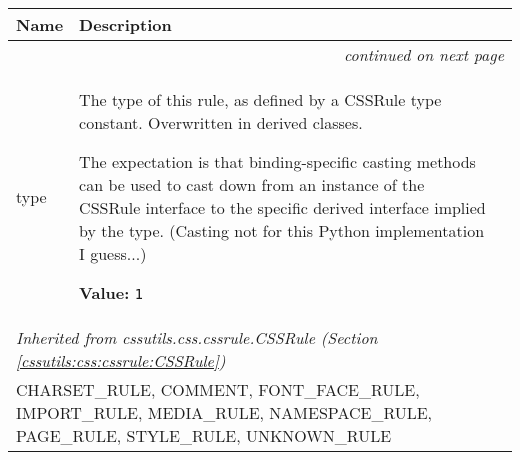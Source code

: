     \vspace{-1cm}
\hspace{\varindent}\begin{longtable}{|p{\varnamewidth}|p{\vardescrwidth}|l}
\cline{1-2}
\cline{1-2} \centering \textbf{Name} & \centering \textbf{Description}& \\
\cline{1-2}
\endhead\cline{1-2}\multicolumn{3}{r}{\small\textit{continued on next page}}\\\endfoot\cline{1-2}
\endlastfoot\raggedright t\-y\-p\-e\- & \raggedright The type of this rule, as defined by a CSSRule type constant.
Overwritten in derived classes.

The expectation is that binding-specific casting methods can be used to
cast down from an instance of the CSSRule interface to the specific
derived interface implied by the type.
(Casting not for this Python implementation I guess...)

\textbf{Value:} 
{\tt 1}&\\
\cline{1-2}
\multicolumn{2}{|l|}{\textit{Inherited from cssutils.css.cssrule.CSSRule \textit{(Section \ref{cssutils:css:cssrule:CSSRule})}}}\\
\multicolumn{2}{|p{\varwidth}|}{\raggedright CHARSET\_RULE, COMMENT, FONT\_FACE\_RULE, IMPORT\_RULE, MEDIA\_RULE, NAMESPACE\_RULE, PAGE\_RULE, STYLE\_RULE, UNKNOWN\_RULE}\\
\cline{1-2}
\end{longtable}

